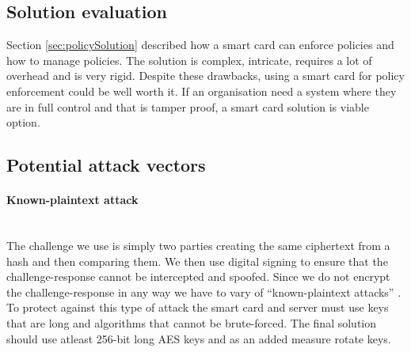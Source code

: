 \subsection{Solution evaluation}
Section \ref{sec:policySolution} described how a smart card can enforce policies and how to manage policies. The solution is complex, intricate, requires a lot of overhead and is very rigid. Despite these drawbacks, using a smart card for policy enforcement could be well worth it. If an organisation need a system where they are in full control and that is tamper proof, a smart card solution is viable option.

\subsection{Potential attack vectors}
\paragraph{Known-plaintext attack}\mbox{}\\
The challenge we use is simply two parties creating the same ciphertext from a hash and then comparing them. We then use digital signing to ensure that the challenge-response cannot be intercepted and spoofed. Since we do not encrypt the challenge-response in any way we have to vary of ``known-plaintext attacks'' \cite{knownplaintextattack}. To protect against this type of attack the smart card and server must use keys that are long and algorithms that cannot be brute-forced. The final solution should use atleast 256-bit long AES keys and as an added measure rotate keys.






